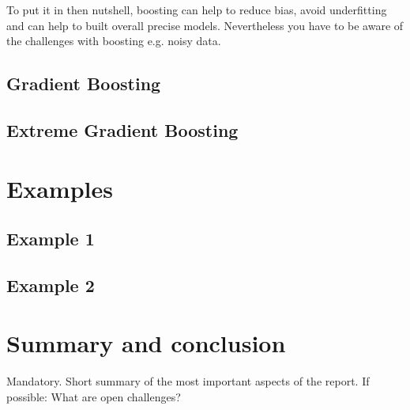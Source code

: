 To put it in then nutshell, boosting can help to reduce bias, avoid underfitting
and can help to built overall precise models. Nevertheless you have to be aware
of the challenges with boosting e.g. noisy data.


\subsection{Gradient Boosting}

\subsection{Extreme Gradient Boosting}


\section{Examples}
\subsection{Example 1}
\subsection{Example 2}

\section{Summary and conclusion}
Mandatory. Short summary of the most important aspects of the report.
If possible: What are open challenges?


